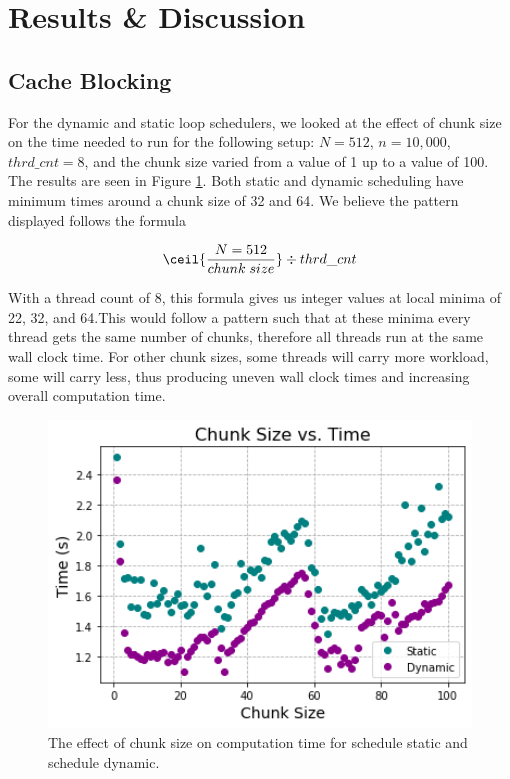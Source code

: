 \documentclass{article}
\begin{document}
\section{Results \& Discussion}

\subsection{Cache Blocking}

For the dynamic and static loop schedulers, we looked at the effect of chunk size on the time needed to run for the following setup: $N = 512$, $n = 10,000$, $thrd\_cnt = 8$, and the chunk size varied from a value of 1 up to a value of 100. The results are seen in Figure \ref{Chunk_Size}. Both static and dynamic scheduling have minimum times around a chunk size of 32 and 64. We believe the pattern displayed follows the formula

\begin{equation}
\ceil{\dfrac{N=512}{chunk\; size}} \div thrd\_cnt
\end{equation}

With a thread count of 8, this formula gives us integer values at local minima of 22, 32, and 64.This would follow a pattern such that at these minima every thread gets the same number of chunks, therefore all threads run at the same wall clock time. For other chunk sizes, some threads will carry more workload, some will carry less, thus producing uneven wall clock times and increasing overall computation time. 



\begin{figure}[h]
\centering
\includegraphics[width=1.0\textwidth]{Images/Chunk Size vs Time.png}
\caption{The effect of chunk size on computation time for schedule static and schedule dynamic.}
\label{Chunk_Size}
\end{figure}
\end{document}
